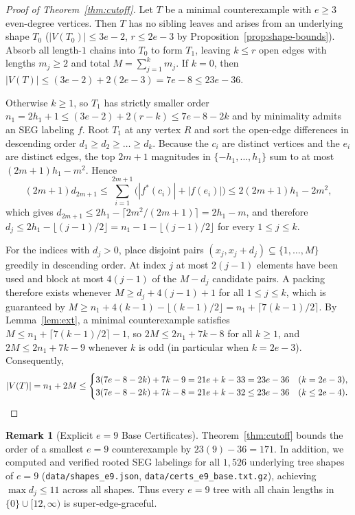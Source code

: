 \documentclass[11pt]{article}
\theoremstyle{definition}
\newtheorem{remark}[theorem]{Remark}
\begin{document}
\begin{proof}[Proof of Theorem~\ref{thm:cutoff}]
Let $T$ be a minimal counterexample with $e \ge 3$ even-degree vertices. Then $T$ has no sibling leaves and arises from an underlying shape $T_0$ ($|V(T_0)| \le 3e - 2$, $r \le 2e - 3$ by Proposition~\ref{prop:shape-bounds}). Absorb all length-$1$ chains into $T_0$ to form $T_1$, leaving $k \le r$ open edges with lengths $m_j \ge 2$ and total $M = \sum_{j=1}^k m_j$. If $k = 0$, then $|V(T)| \le (3e - 2) + 2(2e - 3) = 7e - 8 \le 23e - 36$.

Otherwise $k \ge 1$, so $T_1$ has strictly smaller order $n_1 = 2h_1 + 1 \le (3e - 2) + 2(r - k) \le 7e - 8 - 2k$ and by minimality admits an SEG labeling $f$. Root $T_1$ at any vertex $R$ and sort the open-edge differences in descending order $d_1 \ge d_2 \ge \dots \ge d_k$. Because the $c_i$ are distinct vertices and the $e_i$ are distinct edges, the top $2m+1$ magnitudes in $\{-h_1, \dots, h_1\}$ sum to at most $(2m+1)h_1 - m^2$. Hence
\[
(2m+1) d_{2m+1} \le \sum_{i=1}^{2m+1} \bigl(|f^*(c_i)| + |f(e_i)|\bigr) \le 2(2m+1)h_1 - 2m^2,
\]
which gives $d_{2m+1} \le 2h_1 - \lceil 2m^2/(2m+1) \rceil = 2h_1 - m$, and therefore $d_j \le 2h_1 - \lfloor (j-1)/2 \rfloor = n_1 - 1 - \lfloor (j-1)/2 \rfloor$ for every $1 \le j \le k$.

For the indices with $d_j>0$, place disjoint pairs $(x_j, x_j + d_j) \subseteq \{1, \dots, M\}$ greedily in descending order. At index $j$ at most $2(j-1)$ elements have been used and block at most $4(j-1)$ of the $M - d_j$ candidate pairs. A packing therefore exists whenever $M \ge d_j + 4(j-1) + 1$ for all $1 \le j \le k$, which is guaranteed by $M \ge n_1 + 4(k-1) - \lfloor (k-1)/2 \rfloor = n_1 + \lceil 7(k-1)/2 \rceil$. By Lemma~\ref{lem:ext}, a minimal counterexample satisfies $M \le n_1 + \lceil 7(k-1)/2 \rceil - 1$, so $2M \le 2n_1 + 7k - 8$ for all $k \ge 1$, and $2M \le 2n_1 + 7k - 9$ whenever $k$ is odd (in particular when $k = 2e - 3$). Consequently,
\[
|V(T)| = n_1 + 2M \le \begin{cases} 3(7e - 8 - 2k) + 7k - 9 = 21e + k - 33 = 23e - 36 & (k = 2e - 3), \\ 3(7e - 8 - 2k) + 7k - 8 = 21e + k - 32 \le 23e - 36 & (k \le 2e - 4). \end{cases} \qedhere
\]
\end{proof}

\begin{remark}[Explicit $e = 9$ Base Certificates]
Theorem~\ref{thm:cutoff} bounds the order of a smallest $e = 9$ counterexample by $23(9) - 36 = 171$. In addition, we computed and verified rooted SEG labelings for all $1{,}526$ underlying tree shapes of $e = 9$ (\texttt{data/shapes\_e9.json}, \texttt{data/certs\_e9\_base.txt.gz}), achieving $\max d_j \le 11$ across all shapes. Thus every $e = 9$ tree with all chain lengths in $\{0\} \cup [12, \infty)$ is super-edge-graceful.
\end{remark}
\end{document}
